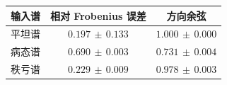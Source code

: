 \begin{tabular}{lcc}\toprule
输入谱 & 相对 Frobenius 误差 & 方向余弦 \\ \midrule
平坦谱 & $0.197\,\pm\,0.133$ & $1.000\,\pm\,0.000$ \\
病态谱 & $0.690\,\pm\,0.003$ & $0.731\,\pm\,0.004$ \\
秩亏谱 & $0.229\,\pm\,0.009$ & $0.978\,\pm\,0.003$ \\
\bottomrule\end{tabular}
